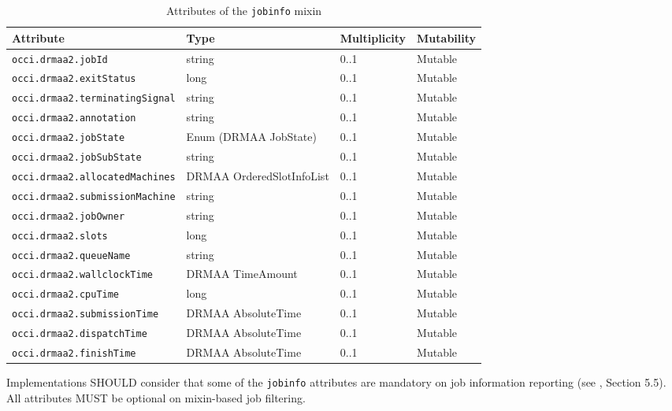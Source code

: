 \documentclass[10pt]{article}
\newcommand{\h}[1]{\lstinline|#1|}
\begin{document}
\begin{table}[ht]
\centering
\begin{tabularx}{\textwidth}{|l|X|l|l|}
\hline 
Attribute           & Type                         & Multiplicity & Mutability \\
\hline
\h{occi.drmaa2.jobId}               & string                       & 0..1 & Mutable   \\ 
\h{occi.drmaa2.exitStatus}          & long                         & 0..1 & Mutable   \\
\h{occi.drmaa2.terminatingSignal}   & string                       & 0..1 & Mutable   \\
\h{occi.drmaa2.annotation}          & string                       & 0..1 & Mutable   \\
\h{occi.drmaa2.jobState}            & Enum (DRMAA JobState)        & 0..1 & Mutable   \\
\h{occi.drmaa2.jobSubState}         & string                       & 0..1 & Mutable   \\
\h{occi.drmaa2.allocatedMachines}   & DRMAA OrderedSlotInfoList    & 0..1 & Mutable   \\
\h{occi.drmaa2.submissionMachine}   & string                       & 0..1 & Mutable   \\
\h{occi.drmaa2.jobOwner}            & string                       & 0..1 & Mutable   \\
\h{occi.drmaa2.slots}               & long                         & 0..1 & Mutable   \\
\h{occi.drmaa2.queueName}           & string                       & 0..1 & Mutable   \\
\h{occi.drmaa2.wallclockTime}       & DRMAA TimeAmount             & 0..1 & Mutable   \\
\h{occi.drmaa2.cpuTime}             & long                         & 0..1 & Mutable   \\
\h{occi.drmaa2.submissionTime}      & DRMAA AbsoluteTime           & 0..1 & Mutable   \\
\h{occi.drmaa2.dispatchTime}        & DRMAA AbsoluteTime           & 0..1 & Mutable   \\
\h{occi.drmaa2.finishTime}          & DRMAA AbsoluteTime           & 0..1 & Mutable   \\
\hline
\end{tabularx}
\caption{Attributes of the \h{jobinfo} mixin}
\label{tab:jobinfoattributes}
\end{table}

Implementations SHOULD consider that some of the \h{jobinfo} attributes are mandatory on job information reporting (see \cite{gfd194}, Section 5.5). All attributes MUST be optional on mixin-based job filtering.
\end{document}
